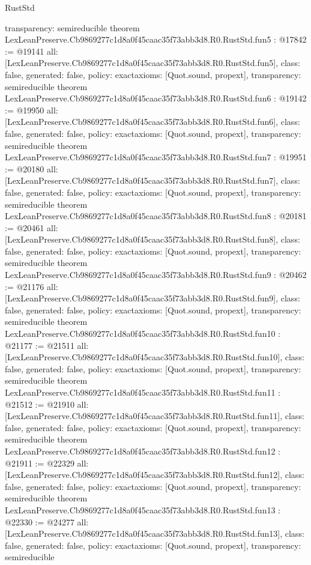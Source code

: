 \begin{lexlean}{RustStd}
\begin{coremodule}
{  transparency: semireducible
}
theorem LexLeanPreserve.Cb9869277c1d8a0f45caac35f73abb3d8.R0.RustStd.fun5 : @17842 := @19141 {
  all: [LexLeanPreserve.Cb9869277c1d8a0f45caac35f73abb3d8.R0.RustStd.fun5],
  class: false,
  generated: false,
  policy: exact{axioms: [Quot.sound, propext]},
  transparency: semireducible
}
theorem LexLeanPreserve.Cb9869277c1d8a0f45caac35f73abb3d8.R0.RustStd.fun6 : @19142 := @19950 {
  all: [LexLeanPreserve.Cb9869277c1d8a0f45caac35f73abb3d8.R0.RustStd.fun6],
  class: false,
  generated: false,
  policy: exact{axioms: [Quot.sound, propext]},
  transparency: semireducible
}
theorem LexLeanPreserve.Cb9869277c1d8a0f45caac35f73abb3d8.R0.RustStd.fun7 : @19951 := @20180 {
  all: [LexLeanPreserve.Cb9869277c1d8a0f45caac35f73abb3d8.R0.RustStd.fun7],
  class: false,
  generated: false,
  policy: exact{axioms: [Quot.sound, propext]},
  transparency: semireducible
}
theorem LexLeanPreserve.Cb9869277c1d8a0f45caac35f73abb3d8.R0.RustStd.fun8 : @20181 := @20461 {
  all: [LexLeanPreserve.Cb9869277c1d8a0f45caac35f73abb3d8.R0.RustStd.fun8],
  class: false,
  generated: false,
  policy: exact{axioms: [Quot.sound, propext]},
  transparency: semireducible
}
theorem LexLeanPreserve.Cb9869277c1d8a0f45caac35f73abb3d8.R0.RustStd.fun9 : @20462 := @21176 {
  all: [LexLeanPreserve.Cb9869277c1d8a0f45caac35f73abb3d8.R0.RustStd.fun9],
  class: false,
  generated: false,
  policy: exact{axioms: [Quot.sound, propext]},
  transparency: semireducible
}
theorem LexLeanPreserve.Cb9869277c1d8a0f45caac35f73abb3d8.R0.RustStd.fun10 : @21177 := @21511 {
  all: [LexLeanPreserve.Cb9869277c1d8a0f45caac35f73abb3d8.R0.RustStd.fun10],
  class: false,
  generated: false,
  policy: exact{axioms: [Quot.sound, propext]},
  transparency: semireducible
}
theorem LexLeanPreserve.Cb9869277c1d8a0f45caac35f73abb3d8.R0.RustStd.fun11 : @21512 := @21910 {
  all: [LexLeanPreserve.Cb9869277c1d8a0f45caac35f73abb3d8.R0.RustStd.fun11],
  class: false,
  generated: false,
  policy: exact{axioms: [Quot.sound, propext]},
  transparency: semireducible
}
theorem LexLeanPreserve.Cb9869277c1d8a0f45caac35f73abb3d8.R0.RustStd.fun12 : @21911 := @22329 {
  all: [LexLeanPreserve.Cb9869277c1d8a0f45caac35f73abb3d8.R0.RustStd.fun12],
  class: false,
  generated: false,
  policy: exact{axioms: [Quot.sound, propext]},
  transparency: semireducible
}
theorem LexLeanPreserve.Cb9869277c1d8a0f45caac35f73abb3d8.R0.RustStd.fun13 : @22330 := @24277 {
  all: [LexLeanPreserve.Cb9869277c1d8a0f45caac35f73abb3d8.R0.RustStd.fun13],
  class: false,
  generated: false,
  policy: exact{axioms: [Quot.sound, propext]},
  transparency: semireducible
}
\end{coremodule}
\end{lexlean}
